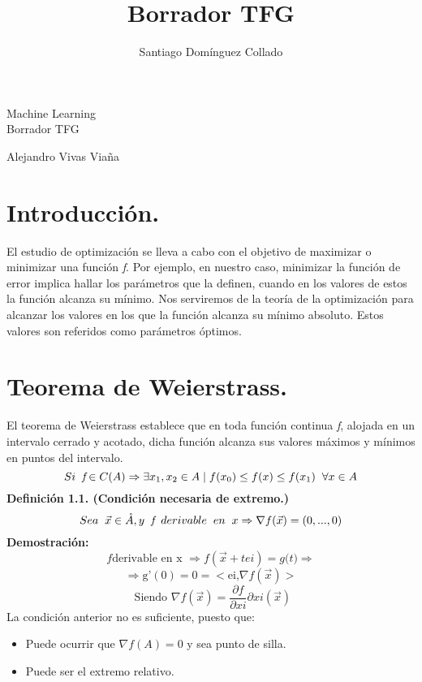 \documentclass[a4paper,10pt]{article}
\author{Santiago Domínguez Collado}
\title{Borrador TFG}
\begin{document}
\begin{center}
\begin{LARGE}
Machine Learning \\
\vspace*{0.15in}
Borrador TFG
\end{LARGE}
\end{center}
\begin{center}
\begin{large}
Alejandro Vivas Viaña
\end{large}
\end{center}

\section{Introducción.}
\label{}
\noindent
El estudio de optimización se lleva a cabo con el objetivo de maximizar o minimizar una función \textit{f}.
Por ejemplo, en nuestro caso, minimizar la función de error implica hallar los parámetros que la definen, cuando en los valores de estos la función alcanza su mínimo.
Nos serviremos de la teoría de la optimización para alcanzar los valores en los que la función alcanza su mínimo absoluto. Estos valores son referidos como parámetros óptimos.
\section{Teorema de Weierstrass.}
\noindent
El teorema de Weierstrass establece que en toda función continua \textit{f}, alojada en un intervalo cerrado y acotado, dicha función alcanza sus valores máximos y mínimos en puntos del intervalo.
 \[Si \hspace{0.20cm} \textit{f} \in C(A) \Rightarrow \exists x_{1},x_{2} \in A \mid f(x_{0}) \leq f(x) \leq f(x_{1}) \hspace{0.20cm} \forall x \in A\] 
\textbf{Definición 1.1. (Condición necesaria de extremo.)}
\noindent
\[Sea \hspace{0.20cm} \vec{x} \in \mathring{A}, y\hspace{0.20cm} \textit{f}\hspace{0.20cm} derivable\hspace{0.20cm} en \hspace{0.20cm}x \Rightarrow \nabla f(\vec{x}) = (0,...,0)\]
\textbf{Demostración:} \[f \text{derivable en x } \Rightarrow f(\vec{x}+tei)=\textit{g(t)}\Rightarrow \] 
\[ \Rightarrow \text{g'} (0)=0= <\text{ei,} \nabla f(\vec{x}) >\] 
\[\text{ Siendo }  \nabla f(\vec{x})= \frac{\partial f}{\partial xi} \partial xi (\vec{x})\]
La condición anterior no es suficiente, puesto que:
\begin{itemize}
    \item Puede ocurrir que $\nabla f(A) = 0$ y sea punto de silla.
    \item Puede ser el extremo relativo.
\end{itemize}
\end{document}
